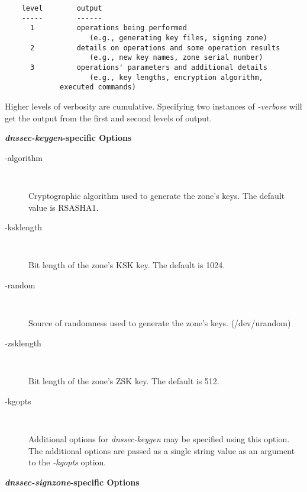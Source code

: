 \begin{description}
\begin{verbatim}
    level        output
    -----        ------
      1          operations being performed
                    (e.g., generating key files, signing zone) 
      2          details on operations and some operation results
                    (e.g., new key names, zone serial number)
      3          operations' parameters and additional details
                    (e.g., key lengths, encryption algorithm,
		     executed commands)
\end{verbatim}

Higher levels of verbosity are cumulative.  Specifying two instances of
{\it -verbose} will get the output from the first and second levels of output.

\end{description}

{\bf {\it dnssec-keygen}-specific Options}

\begin{description}

\item [-algorithm]\verb" "

Cryptographic algorithm used to generate the zone's keys.
The default value is RSA\-SHA1.

\item [-ksklength]\verb" "

Bit length of the zone's KSK key.
The default is 1024.

\item [-random]\verb" "

Source of randomness used to generate the zone's keys.	(/dev/urandom)

\item [-zsklength]\verb" "

Bit length of the zone's ZSK key.
The default is 512.

\item [-kgopts]\verb" "

Additional options for {\it dnssec-keygen} may be specified using this option.
The additional options are passed as a single string value as an argument to
the {\it -kgopts} option.

\end{description}

{\bf {\it dnssec-signzone}-specific Options}

